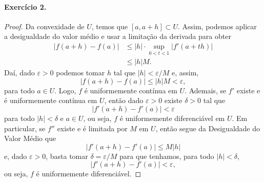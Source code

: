 \documentclass[12pt,a4paper]{article}
\begin{document}
\paragraph{Exercício 2.}
    \begin{proof}
        Da convexidade de $U$, temos que $[a, a+h]\subset U$. Assim,
        podemos aplicar a desigualdade do valor médio e usar a limitação
        da derivada para obter
        \begin{align*}
            |f(a+h) - f(a)| &\leq |h|\cdot\sup_{0<t<1} |f'(a+th)| \\
                            &\leq |h|M.
        \end{align*}
        Daí, dado $\varepsilon >0$ podemos tomar $h$ tal que $|h| < \varepsilon/M$
        e, assim,
        \begin{equation*}
            |f(a+h) - f(a)| \leq |h|M < \varepsilon,
        \end{equation*}
        para todo $a\in U$. Logo, $f$ é uniformemente contínua em $U$. Ademais,
        se $f'$ existe e é uniformemente contínua em $U$, então dado 
        $\varepsilon > 0$ existe $\delta > 0$ tal que
        \begin{equation*}
            |f'(a+h) - f'(a)| < \varepsilon
        \end{equation*}
        para todo $|h| < \delta$ e $a\in U$, ou seja, $f$ é uniformemente diferenciável
        em $U$. Em particular, se $f''$ existe e é limitada por $M$ em $U$, então
        segue da Desigualdade do Valor Médio que
        \begin{equation*}
            |f'(a+h) - f'(a)| \leq M|h|
        \end{equation*}
        e, dado $\varepsilon > 0$, basta tomar
        $\delta = \varepsilon/M$ para que tenhamos,
        para todo $|h| < \delta$,
        \begin{equation*}
            |f'(a+h) - f'(a)| < \varepsilon,
        \end{equation*}
        ou seja, $f$ é uniformemente diferenciável.
    \end{proof}
\end{document}
